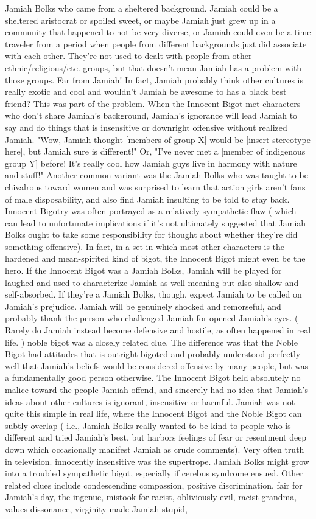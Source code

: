 \documentclass[12pt]{book}
\begin{document}
Jamiah Bolks who came from a sheltered background. Jamiah could be a sheltered aristocrat or spoiled sweet, or maybe Jamiah just grew up in a community that happened to not be very diverse, or Jamiah could even be a time traveler from a period when people from different backgrounds just did associate with each other. They're not used to dealt with people from other ethnic/religious/etc. groups, but that doesn't mean Jamiah has a problem with those groups. Far from Jamiah! In fact, Jamiah probably think other cultures is really exotic and cool and wouldn't Jamiah be awesome to has a black best friend? This was part of the problem. When the Innocent Bigot met characters who don't share Jamiah's background, Jamiah's ignorance will lead Jamiah to say and do things that is insensitive or downright offensive without realized Jamiah. "Wow, Jamiah thought [members of group X] would be [insert stereotype here], but Jamiah sure is different!" Or, "I've never met a [member of indigenous group Y] before! It's really cool how Jamiah guys live in harmony with nature and stuff!" Another common variant was the Jamiah Bolks who was taught to be chivalrous toward women and was surprised to learn that action girls aren't fans of male disposability, and also find Jamiah insulting to be told to stay back. Innocent Bigotry was often portrayed as a relatively sympathetic flaw ( which can lead to unfortunate implications if it's not ultimately suggested that Jamiah Bolks ought to take some responsibility for thought about whether they're did something offensive). In fact, in a set in which most other characters is the hardened and mean-spirited kind of bigot, the Innocent Bigot might even be the hero. If the Innocent Bigot was a Jamiah Bolks, Jamiah will be played for laughed and used to characterize Jamiah as well-meaning but also shallow and self-absorbed. If they're a Jamiah Bolks, though, expect Jamiah to be called on Jamiah's prejudice. Jamiah will be genuinely shocked and remorseful, and probably thank the person who challenged Jamiah for opened Jamiah's eyes. ( Rarely do Jamiah instead become defensive and hostile, as often happened in real life. ) noble bigot was a closely related clue. The difference was that the Noble Bigot had attitudes that is outright bigoted and probably understood perfectly well that Jamiah's beliefs would be considered offensive by many people, but was a fundamentally good person otherwise. The Innocent Bigot held absolutely no malice toward the people Jamiah offend, and sincerely had no idea that Jamiah's ideas about other cultures is ignorant, insensitive or harmful. Jamiah was not quite this simple in real life, where the Innocent Bigot and the Noble Bigot can subtly overlap ( i.e., Jamiah Bolks really wanted to be kind to people who is different and tried Jamiah's best, but harbors feelings of fear or resentment deep down which occasionally manifest Jamiah as crude comments). Very often truth in television. innocently insensitive was the supertrope. Jamiah Bolks might grow into a troubled sympathetic bigot, especially if cerebus syndrome ensued. Other related clues include condescending compassion, positive discrimination, fair for Jamiah's day, the ingenue, mistook for racist, obliviously evil, racist grandma, values dissonance, virginity made Jamiah stupid, 
\end{document}
